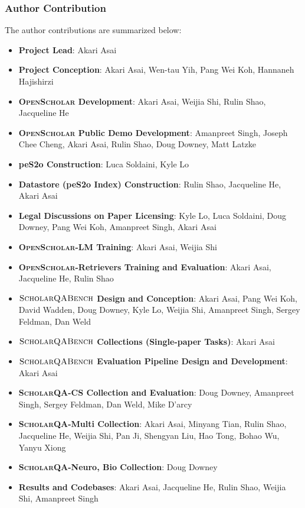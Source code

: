 \documentclass{article} %
\newcommand{\data}{$\textsc{ScholarQABench}$\xspace}
\newcommand{\model}{\textsc{OpenScholar}\xspace}
\begin{document}
\newpage
\subsubsection*{Author Contribution}

The author contributions are summarized below:  
\begin{itemize}[itemsep=1.6pt,leftmargin=12pt,topsep=1.6pt]
    \item {\bf Project Lead}: Akari Asai
    \item {\bf Project Conception}: Akari Asai, Wen-tau Yih, Pang Wei Koh, Hannaneh Hajishirzi
    \item {\bf \model Development}: Akari Asai, Weijia Shi, Rulin Shao, Jacqueline He
    \item {\bf \model Public Demo Development}: Amanpreet Singh, Joseph Chee Cheng, Akari Asai, Rulin Shao, Doug Downey, Matt Latzke
    \item {\bf peS2o Construction}: Luca Soldaini, Kyle Lo
    \item {\bf Datastore (peS2o Index) Construction}: Rulin Shao, Jacqueline He, Akari Asai
    \item {\bf Legal Discussions on Paper Licensing}: Kyle Lo, Luca Soldaini, Doug Downey, Pang Wei Koh, Amanpreet Singh, Akari Asai
    \item {\bf \model-LM Training}: Akari Asai, Weijia Shi
    \item {\bf \model-Retrievers Training and Evaluation}: Akari Asai, Jacqueline He, Rulin Shao
    \item {\bf \data Design and Conception}: Akari Asai, Pang Wei Koh, David Wadden, Doug Downey, Kyle Lo, Weijia Shi, Amanpreet Singh, Sergey Feldman, Dan Weld
    \item {\bf \data Collections (Single-paper Tasks)}: Akari Asai
    \item {\bf \data Evaluation Pipeline Design and Development}: Akari Asai
    \item {\bf \textsc{ScholarQA}-CS Collection and Evaluation}: Doug Downey, Amanpreet Singh, Sergey Feldman, Dan Weld, Mike D’arcy
     \item {\bf \textsc{ScholarQA}-Multi Collection}: Akari Asai, Minyang Tian,  Rulin Shao, Jacqueline He, Weijia Shi, Pan Ji, Shengyan Liu, Hao Tong, Bohao Wu, Yanyu Xiong
    \item {\bf \textsc{ScholarQA}-Neuro, Bio Collection}: Doug Downey
    \item {\bf Results and Codebases}: Akari Asai, Jacqueline He, Rulin Shao, Weijia Shi, Amanpreet Singh

\end{itemize}
\end{document}
